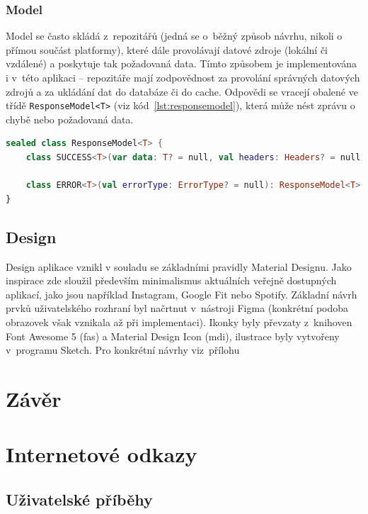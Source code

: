 \documentclass[twoside]{ctuthesis}
\begin{document}
\subsection{Model}
Model se často skládá z~repozitářů (jedná se o~běžný způsob návrhu, nikoli o přímou součást platformy), které dále provolávají datové zdroje (lokální či vzdálené) a poskytuje tak požadovaná data. Tímto způsobem je implementována i v~této aplikaci -- repozitáře mají zodpovědnost za provolání správných datových zdrojů a za ukládání dat do databáze či do cache. Odpovědi se vracejí obalené ve třídě \texttt{ResponseModel<T>} (viz kód~\ref{lst:responsemodel}), která může nést zprávu o chybě nebo požadovaná data.

\begin{lstlisting}[language=Kotlin,caption={Třída \texttt{ResponseModel}},label={lst:responsemodel}]
sealed class ResponseModel<T> {
	class SUCCESS<T>(var data: T? = null, val headers: Headers? = null): ResponseModel<T>()

	class ERROR<T>(val errorType: ErrorType? = null): ResponseModel<T>()
}
\end{lstlisting}

\section{Design}\label{design}

Design aplikace vznikl v souladu se základními pravidly Material Designu. Jako inspirace zde sloužil především minimalismus aktuálních veřejně dos\-tup\-ných aplikací, jako jsou například Instagram, Google Fit nebo Spotify. Základní návrh prvků uživatelského rozhraní byl načrtnut v~nástroji Figma (konkrétní podoba obrazovek však vznikala až při implementaci). Ikonky byly převzaty z~knihoven Font Awesome 5 (fas) a Material Design Icon (mdi), ilustrace byly vytvořeny v~programu Sketch. Pro konkrétní návrhy viz~přílohu 

\chapter*{Závěr}


\printbibliography[title={Seznam použité literatury}]

\appendix

\chapter{Internetové odkazy}
\section{Uživatelské příběhy}\label{sec:user-story}
\end{document}
